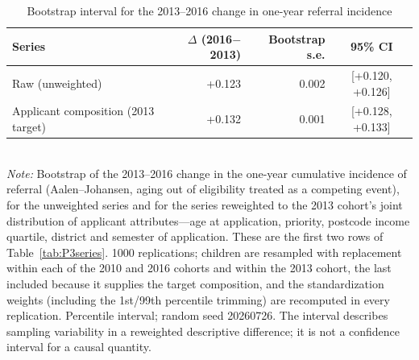 \begin{table}[htbp]\centering
\caption{Bootstrap interval for the 2013--2016 change in one-year referral incidence}
\label{tab:P3boot}
\footnotesize
\setlength{\tabcolsep}{6pt}
\begin{tabular}{lrrc}
\toprule
Series & $\Delta$ (2016$-$2013) & Bootstrap s.e. & 95\% CI \\
\midrule
Raw (unweighted) & +0.123 & 0.002 & [+0.120, +0.126] \\
Applicant composition (2013 target) & +0.132 & 0.001 & [+0.128, +0.133] \\
\bottomrule
\end{tabular}
\\[3pt]{\footnotesize \textit{Note:} Bootstrap of the 2013--2016 change in the one-year cumulative incidence of referral (Aalen--Johansen, aging out of eligibility treated as a competing event), for the unweighted series and for the series reweighted to the 2013 cohort's joint distribution of applicant attributes---age at application, priority, postcode income quartile, district and semester of application. These are the first two rows of Table~\ref{tab:P3series}. 1000 replications; children are resampled with replacement within each of the 2010 and 2016 cohorts and within the 2013 cohort, the last included because it supplies the target composition, and the standardization weights (including the 1st/99th percentile trimming) are recomputed in every replication. Percentile interval; random seed 20260726. The interval describes sampling variability in a reweighted descriptive difference; it is not a confidence interval for a causal quantity.}
\end{table}

